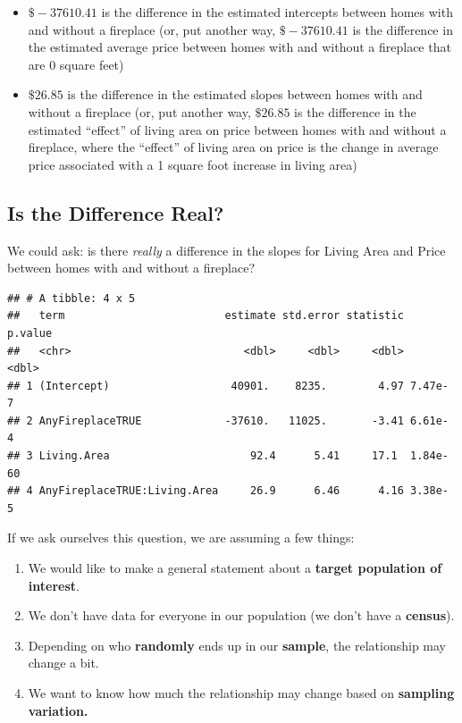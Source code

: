 \documentclass[
]{book}
\newenvironment{Shaded}{\begin{snugshade}}{\end{snugshade}}
\newcommand{\KeywordTok}[1]{\textcolor[rgb]{0.13,0.29,0.53}{\textbf{#1}}}
\newcommand{\NormalTok}[1]{#1}
\newcommand{\OperatorTok}[1]{\textcolor[rgb]{0.81,0.36,0.00}{\textbf{#1}}}
\newcommand{\StringTok}[1]{\textcolor[rgb]{0.31,0.60,0.02}{#1}}
\providecommand{\tightlist}{%
  \setlength{\itemsep}{0pt}\setlength{\parskip}{0pt}}
\begin{document}
\begin{itemize}
\tightlist
\item
  \(\$-37610.41\) is the difference in the estimated intercepts between homes with and without a fireplace (or, put another way, \(\$-37610.41\) is the difference in the estimated average price between homes with and without a fireplace that are 0 square feet)
\item
  \(\$26.85\) is the difference in the estimated slopes between homes with and without a fireplace (or, put another way, \(\$26.85\) is the difference in the estimated ``effect'' of living area on price between homes with and without a fireplace, where the ``effect'' of living area on price is the change in average price associated with a 1 square foot increase in living area)
\end{itemize}

\hypertarget{is-the-difference-real}{%
\subsection{Is the Difference Real?}\label{is-the-difference-real}}

We could ask: is there \emph{really} a difference in the slopes for Living Area and Price between homes with and without a fireplace?

\begin{Shaded}
\end{Shaded}

\begin{verbatim}
## # A tibble: 4 x 5
##   term                         estimate std.error statistic  p.value
##   <chr>                           <dbl>     <dbl>     <dbl>    <dbl>
## 1 (Intercept)                   40901.    8235.        4.97 7.47e- 7
## 2 AnyFireplaceTRUE             -37610.   11025.       -3.41 6.61e- 4
## 3 Living.Area                      92.4      5.41     17.1  1.84e-60
## 4 AnyFireplaceTRUE:Living.Area     26.9      6.46      4.16 3.38e- 5
\end{verbatim}

If we ask ourselves this question, we are assuming a few things:

\begin{enumerate}
\def\labelenumi{\arabic{enumi}.}
\item
  We would like to make a general statement about a \textbf{target population of interest}.
\item
  We don't have data for everyone in our population (we don't have a \textbf{census}).
\item
  Depending on who \textbf{randomly} ends up in our \textbf{sample}, the relationship may change a bit.
\item
  We want to know how much the relationship may change based on \textbf{sampling variation.}
\end{enumerate}
\end{document}
